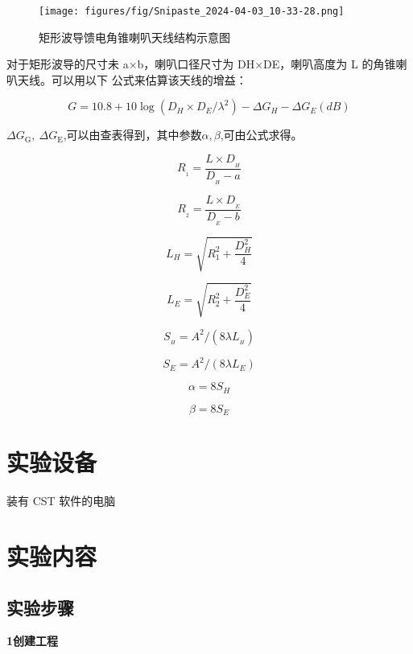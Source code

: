 \documentclass[12pt,hyperref,a4paper,UTF8]{ctexart}
\begin{document}
\begin{figure}[H]
    \centering
    \texttt{[image: figures/fig/Snipaste\_2024-04-03\_10-33-28.png]}
    \caption{矩形波导馈电角锥喇叭天线结构示意图}
    \label{fig:enter-label}
\end{figure}

对于矩形波导的尺寸未 a×b，喇叭口径尺寸为 DH×DE，喇叭高度为 L 的角锥喇叭天线。可以用以下
公式来估算该天线的增益：

$$
G=10.8+10\log(D_{H}\times D_{E}/\lambda^{2})-\Delta G_{H}-\Delta G_{E}(dB)
$$

$\Delta G_{\mathrm{G}},~\Delta G_{\mathrm{E}}$,可以由查表得到，其中参数$α, β$,可由公式求得。

$$
R_{_1}=\frac{L\times D_{_H}}{D_{_H}-a}
$$

$$
R_{_2}=\frac{L\times D_{_E}}{D_{_E}-b}
$$

$$
L_{H}=\sqrt{R_{1}^{2}+\frac{D_{H}^{2}}{4}}
$$

$$
L_{E}=\sqrt{R_{2}^{2}+\frac{D_{E}^{2}}{4}}
$$

$$
S_{_H}=A^{2}/(8\lambda L_{_H})
$$

$$
S_{E}=A^{2}/(8\lambda L_{E})
$$

$$
\alpha=8S_{H}
$$

$$
\beta=8S_{E}
$$


\section{实验设备}
装有 CST 软件的电脑





\section{实验内容}


\subsection*{实验步骤}


\noindent \textbf{1创建工程} 
\end{document}
